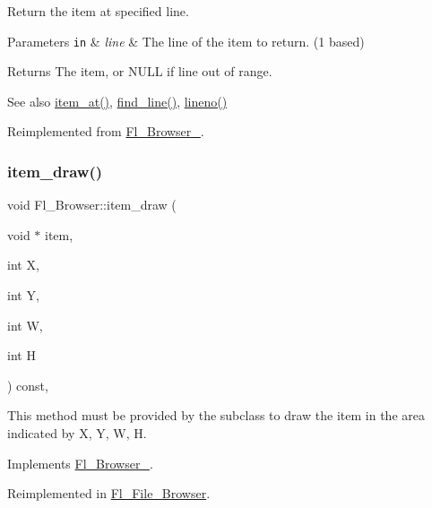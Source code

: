 Return the item at specified {\ttfamily line}. 
\begin{DoxyParams}[1]{Parameters}
\mbox{\tt in}  & {\em line} & The line of the item to return. (1 based) \\
\hline
\end{DoxyParams}
\begin{DoxyReturn}{Returns}
The item, or N\+U\+LL if line out of range. 
\end{DoxyReturn}
\begin{DoxySeeAlso}{See also}
\hyperlink{class_fl___browser_aa1d22a122c794581b30183f045db2959}{item\+\_\+at()}, \hyperlink{class_fl___browser_abefae9979ef09100d0c4c811cb3dedd7}{find\+\_\+line()}, \hyperlink{class_fl___browser_a16511721cb9fba104bc843f1d1589617}{lineno()} 
\end{DoxySeeAlso}


Reimplemented from \hyperlink{class_fl___browser___a6dd51e0b34953ddb1de33a750ab07c22}{Fl\+\_\+\+Browser\+\_\+}.

\mbox{\label{class_fl___browser_a99dd1f2cf866b107a5742d1e35774620}} 
\subsubsection{\texorpdfstring{item\+\_\+draw()}{item\_draw()}}
{\footnotesize\ttfamily void Fl\+\_\+\+Browser\+::item\+\_\+draw (\begin{DoxyParamCaption}\item[{void $\ast$}]{item,  }\item[{int}]{X,  }\item[{int}]{Y,  }\item[{int}]{W,  }\item[{int}]{H }\end{DoxyParamCaption}) const\hspace{0.3cm}{\ttfamily [protected]}, {\ttfamily [virtual]}}

This method must be provided by the subclass to draw the {\ttfamily item} in the area indicated by {\ttfamily X}, {\ttfamily Y}, {\ttfamily W}, {\ttfamily H}. 

Implements \hyperlink{class_fl___browser___ad145a5000b8ec78a45270a1d9294aa15}{Fl\+\_\+\+Browser\+\_\+}.



Reimplemented in \hyperlink{class_fl___file___browser_adac9f1a1881c10b99250861ec1794b99}{Fl\+\_\+\+File\+\_\+\+Browser}.

